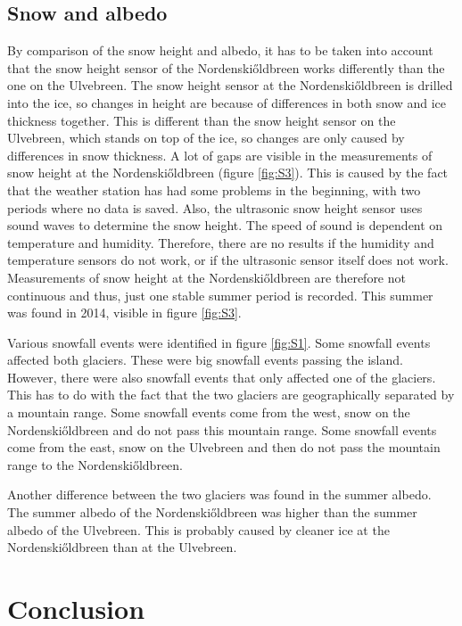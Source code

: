 \documentclass[11pt]{report}
\begin{document}
\section{Snow and albedo}\label{sec:sa}
By comparison of the snow height and albedo, it has to be taken into account that the snow height sensor of the Nordenski\H{o}ldbreen works differently than the one on the Ulvebreen. The snow height sensor at the Nordenski\H{o}ldbreen is drilled into the ice, so changes in height are because of differences in both snow and ice thickness together. This is different than the snow height sensor on the Ulvebreen, which stands on top of the ice, so changes are only caused by differences in snow thickness. A lot of gaps are visible in the measurements of snow height at the Nordenski\H{o}ldbreen (figure \ref{fig:S3}). This is caused by the fact that the weather station has had some problems in the beginning, with two periods where no data is saved. Also, the ultrasonic snow height sensor uses sound waves to determine the snow height. The speed of sound is dependent on temperature and humidity. Therefore, there are no results if the humidity and temperature sensors do not work, or if the ultrasonic sensor itself does not work. Measurements of snow height at the Nordenski\H{o}ldbreen are therefore not continuous and thus, just one stable summer period is recorded. This summer was found in 2014, visible in figure \ref{fig:S3}.

Various snowfall events were identified in figure \ref{fig:S1}. Some snowfall events affected both glaciers. These were big snowfall events passing the island. However, there were also snowfall events that only affected one of the glaciers. This has to do with the fact that the two glaciers are geographically separated by a mountain range. Some snowfall events come from the west, snow on the Nordenski\H{o}ldbreen and do not pass this mountain range. Some snowfall events come from the east, snow on the Ulvebreen and then do not pass the mountain range to the Nordenski\H{o}ldbreen. 

Another difference between the two glaciers was found in the summer albedo. The summer albedo of the Nordenski\H{o}ldbreen was higher than the summer albedo of the Ulvebreen. This is probably caused by cleaner ice at the Nordenski\H{o}ldbreen than at the Ulvebreen. 


\chapter{Conclusion}\label{sec:conclusion}
\end{document}
